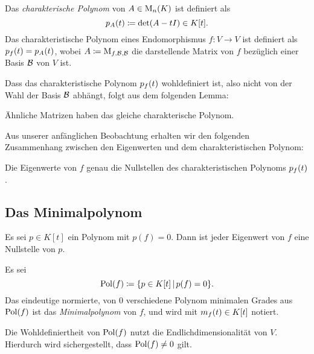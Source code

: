 \begin{definition}
  Das \emph{charakterische Polynom} von $A \in \operatorname{M}_{n}(K)$ ist definiert als
  \[
              p_{A}(t)
    \coloneqq \det ( A - t I )
    \in       K[t].
  \]
  Das charakteristische Polynom eines Endomorphismus $f \colon V \to V$ ist definiert als $p_{f}(t) = p_{A}(t)$, wobei $A \coloneqq \operatorname{M}_{f, \mathcal{B}, \mathcal{B}}$ die darstellende Matrix von $f$ bezüglich einer Basis $\mathcal{B}$ von $V$ ist.
\end{definition}

Dass das charakteristische Polynom $p_{f}(t)$ wohldefiniert ist, also nicht von der Wahl der Basis $\mathcal{B}$ abhängt, folgt aus dem folgenden Lemma:

\begin{lemma}
  Ähnliche Matrizen haben das gleiche charakterische Polynom.
\end{lemma}

Aus unserer anfänglichen Beobachtung erhalten wir den folgenden Zusammenhang zwischen den Eigenwerten und dem charakteristischen Polynom:

\begin{proposition}
  Die Eigenwerte von $f$ genau die Nullstellen des charakteristischen Polynoms $p_{f}(t)$.
\end{proposition}





\subsection{Das Minimalpolynom}

\begin{lemma}
  \label{lemma: polynomial equations give restriction for the eigenvalues}
  Es sei $p \in K[t]$ ein Polynom mit $p(f) = 0$.
  Dann ist jeder Eigenwert von $f$ eine Nullstelle von $p$.
\end{lemma}

\begin{definition}
  Es sei
  \[
              \operatorname{Pol}(f)
    \coloneqq \{ p \in K[t] \,|\, p(f) = 0 \}.
  \]
  Das eindeutige normierte, von $0$ verschiedene Polynom minimalen Grades aus $\operatorname{Pol}(f)$ ist das \emph{Minimalpolynom} von $f$, und wird mit $m_{f}(t) \in K[t]$ notiert.
\end{definition}

\begin{remark}
  Die Wohldefiniertheit von $\operatorname{Pol}(f)$ nutzt die Endlichdimensionalität von $V$.
  Hierdurch wird sichergestellt, dass $\operatorname{Pol}(f) \neq 0$ gilt.
\end{remark}

